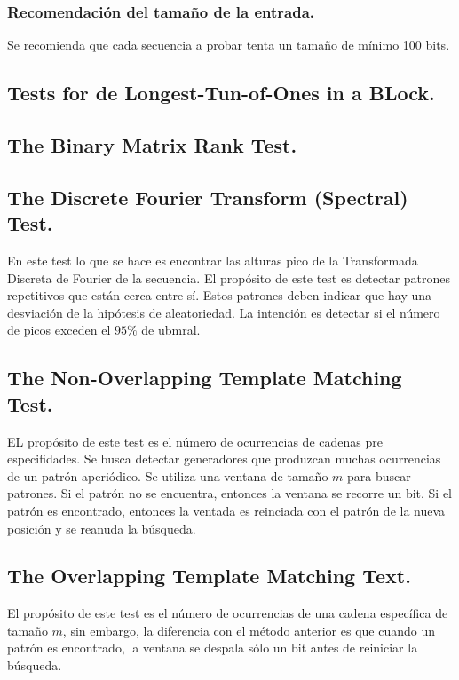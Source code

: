\documentclass{llncs}
\theoremstyle{plane}
\begin{document}
\subsubsection{Recomendación del tamaño de la entrada.}
Se recomienda que cada secuencia a probar tenta un tamaño de mínimo 100 bits. 


\subsection{Tests for de Longest-Tun-of-Ones in a BLock.}
\subsection{The Binary Matrix Rank Test.}
\subsection{The Discrete Fourier Transform (Spectral) Test.}
En este test lo que se hace es encontrar las alturas pico de la Transformada Discreta de Fourier de la secuencia. El propósito de este test es detectar patrones repetitivos que están cerca entre sí.  Estos patrones deben indicar que hay una desviación de la hipótesis de aleatoriedad. La intención es detectar si el número de picos exceden el $95\%$ de ubmral.


\subsection{The Non-Overlapping Template Matching Test.}
EL propósito de este test es el número de ocurrencias de cadenas pre especifidades. Se busca detectar generadores que produzcan muchas ocurrencias de un patrón aperiódico. Se utiliza una ventana de tamaño $m$ para buscar patrones. Si el patrón no se encuentra, entonces la ventana se recorre un bit. Si el patrón es encontrado, entonces la ventada es reinciada con el patrón de la nueva posición y se reanuda la búsqueda.


\subsection{The Overlapping Template Matching Text.}
El propósito de este test es el número de ocurrencias de una cadena específica de tamaño $m$, sin embargo, la diferencia con el método anterior es que cuando un patrón es encontrado, la ventana se despala sólo un bit antes de reiniciar la búsqueda.
\end{document}
